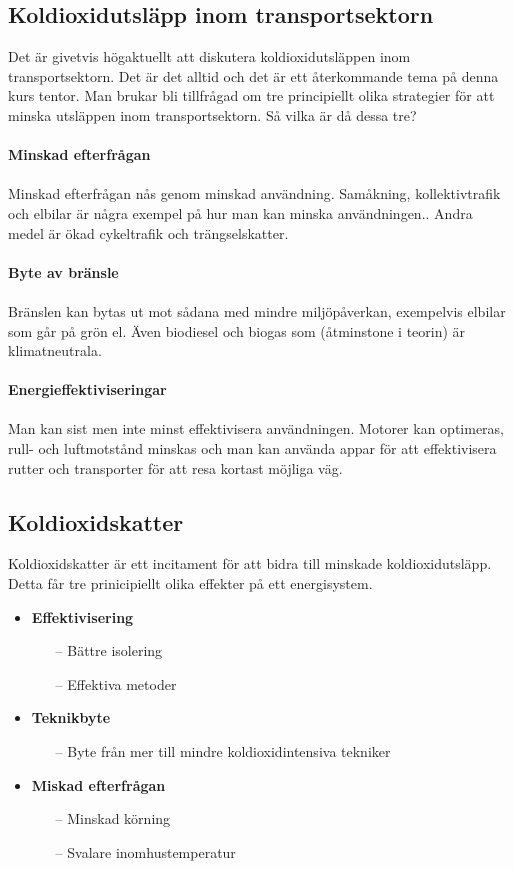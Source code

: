 \documentclass{article}
\begin{document}
\subsection{Koldioxidutsläpp inom transportsektorn}

Det är givetvis högaktuellt att diskutera koldioxidutsläppen inom transportsektorn. Det är det alltid och det är ett återkommande tema på denna kurs tentor. Man brukar bli tillfrågad om tre principiellt olika strategier för att minska utsläppen inom transportsektorn. Så vilka är då dessa tre?\\
\\
\textbf{Minskad efterfrågan}\\
\\
Minskad efterfrågan nås genom minskad användning. Samåkning, kollektivtrafik och elbilar är några exempel på hur man kan minska användningen.. Andra medel är ökad cykeltrafik och trängselskatter.
\\
\\
\textbf{Byte av bränsle}\\
\\
Bränslen kan bytas ut mot sådana med mindre miljöpåverkan, exempelvis elbilar som går på grön el. Även biodiesel och biogas som (åtminstone i teorin) är klimatneutrala.\\

\newpage
\\
\textbf{Energieffektiviseringar}\\
\\
Man kan sist men inte minst effektivisera användningen. Motorer kan optimeras, rull- och luftmotstånd minskas och man kan använda appar för att effektivisera rutter och transporter för att resa kortast möjliga väg.
\subsection{Koldioxidskatter}
Koldioxidskatter är ett incitament för att bidra till minskade koldioxidutsläpp. Detta får tre prinicipiellt olika effekter på ett energisystem.
\begin{itemize}
    \item \textbf{Effektivisering} 
    \begin{itemize}
        \item[--] Bättre isolering
        \item[--] Effektiva metoder
    \end{itemize}
    \item \textbf{Teknikbyte}
    \begin{itemize}
        \item[--] Byte från mer till mindre koldioxidintensiva tekniker
    \end{itemize}
    \item \textbf{Miskad efterfrågan}
    \begin{itemize}
        \item[--] Minskad körning
        \item[--] Svalare inomhustemperatur
    \end{itemize}
\end{itemize}
\end{document}
